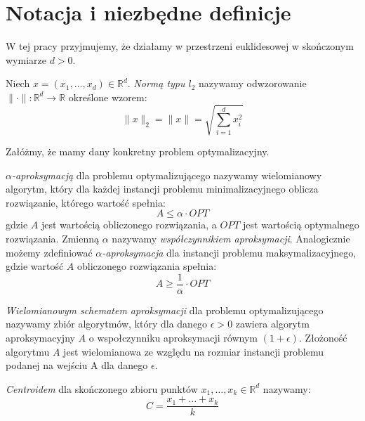 \chapter{Notacja i niezbędne definicje}\label{preliminaries}

W tej pracy przyjmujemy, że działamy w przestrzeni euklidesowej w skończonym wymiarze $d > 0$.

\begin{definition}
    Niech $x = (x_{1}, \dots, x_{d}) \in \mathbb{R}^{d}$.
    \emph{Normą typu $l_{2}$} nazywamy odwzorowanie $\| \cdot \|: \mathbb{R}^{d} \rightarrow \mathbb{R}$ określone wzorem:
    \begin{equation}
        \|x\|_{2} = \|x\| = \sqrt{ \sum_{i = 1}^{d} x_{i}^{2} }
    \end{equation}
\end{definition}

\noindent
Załóżmy, że mamy dany konkretny problem optymalizacyjny. 

\begin{definition}
    \emph{$\alpha$-aproksymacją} dla problemu optymalizującego nazywamy wielomianowy algorytm, który dla każdej instancji problemu minimalizacyjnego oblicza rozwiązanie, którego wartość spełnia: 
    \begin{equation}
        A \leq \alpha \cdot OPT
    \end{equation}
    gdzie $A$ jest wartością obliczonego rozwiązania, a $OPT$ jest wartością optymalnego rozwiązania.
    Zmienną $\alpha$ nazywamy \textit{współczynnikiem aproksymacji}.
    Analogicznie możemy zdefiniować  \emph{$\alpha$-aproksymacja} dla instancji problemu maksymalizacyjnego, gdzie wartość $A$ obliczonego rozwiązania spełnia:
    \begin{equation}
        A \geq \frac{1}{\alpha} \cdot OPT
    \end{equation}
\end{definition}

\begin{definition}
    \emph{Wielomianowym schematem aproksymacji} dla problemu optymalizującego nazywamy zbiór algorytmów, który dla danego $\epsilon > 0$ zawiera algorytm aproksymacyjny $A$ o wspołczynniku aproksymacji równym $(1+\epsilon)$.
    Złożoność algorytmu $A$ jest wielomianowa ze względu na rozmiar instancji problemu podanej na wejściu A dla danego $\epsilon$.
\end{definition}

\begin{definition}
    \emph{Centroidem} dla skończonego zbioru punktów $x_{1}, \dots, x_{k} \in \mathbb{R}^{d}$ nazywamy:
    \begin{equation}
        C = \frac{x_{1} + \dots + x_{k}}{k}
    \end{equation}
\end{definition}

